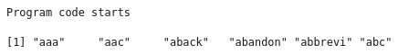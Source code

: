 \texttt{Program\ code\ starts}

\begin{Shaded}
\begin{Highlighting}[]

\OtherTok{\textless{}{-}} \NormalTok{)}
\end{Highlighting}
\end{Shaded}

\begin{verbatim}
[1] "aaa"     "aac"     "aback"   "abandon" "abbrevi" "abc"    
\end{verbatim}

